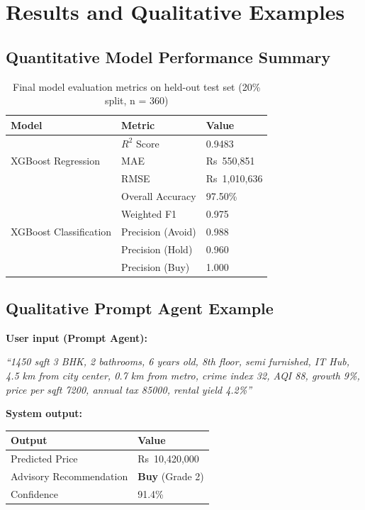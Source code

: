 \documentclass[12pt,a4paper]{article}
\begin{document}
\section{Results and Qualitative Examples}

\subsection{Quantitative Model Performance Summary}

\begin{table}[H]
\centering
\caption{Final model evaluation metrics on held-out test set (20\% split, n = 360)}
\renewcommand{\arraystretch}{1.3}
\begin{tabular}{lll}
\toprule
\textbf{Model} & \textbf{Metric} & \textbf{Value} \\
\midrule
\multirow{3}{*}{XGBoost Regression}
 & $R^{2}$ Score & 0.9483 \\
 & MAE  & Rs~550,851 \\
 & RMSE & Rs~1,010,636 \\
\midrule
\multirow{5}{*}{XGBoost Classification}
 & Overall Accuracy  & 97.50\% \\
 & Weighted F1       & 0.975 \\
 & Precision (Avoid) & 0.988 \\
 & Precision (Hold)  & 0.960 \\
 & Precision (Buy)   & 1.000 \\
\bottomrule
\end{tabular}
\end{table}

\subsection{Qualitative Prompt Agent Example}

\noindent\textbf{User input (Prompt Agent):}

\begin{infobox}
\textit{``1450 sqft 3 BHK, 2 bathrooms, 6 years old, 8th floor, semi furnished, IT Hub, 4.5 km from city center, 0.7 km from metro, crime index 32, AQI 88, growth 9\%, price per sqft 7200, annual tax 85000, rental yield 4.2\%''}
\end{infobox}

\vspace{0.4em}
\noindent\textbf{System output:}

\begin{table}[H]
\centering
\renewcommand{\arraystretch}{1.3}
\begin{tabular}{ll}
\toprule
\textbf{Output} & \textbf{Value} \\
\midrule
Predicted Price               & Rs~10,420,000 \\
Advisory Recommendation       & \textbf{Buy} (Grade 2) \\
Confidence                    & 91.4\% \\
\bottomrule
\end{tabular}
\end{table}
\end{document}
